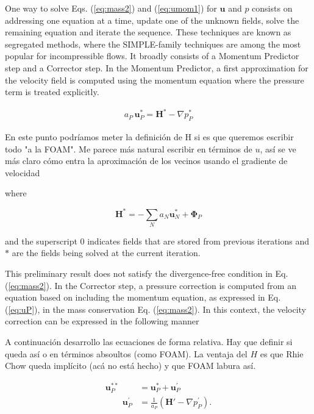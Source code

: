 \documentclass[final,3p,times,10pt,onecolumn]{myElsarticle}
\numberwithin{equation}{section}
\newcommand{\CIP}[1]{{\color{blue} #1}}
\begin{document}
One way to solve Eqs. (\ref{eq:mass2}) and (\ref{eq:umom1}) for $\boldsymbol{u}$ and $p$ consists on addressing one equation at a time, update one of the unknown fields, solve the remaining equation and iterate the sequence. These techniques are known as segregated methods, where the SIMPLE-family techniques \cite{patankar1972,patankar1980,patankar1981,vanDoormal,issa} are among the most popular for incompressible flows. It broadly consists of a Momentum Predictor step and a Corrector step. In the Momentum Predictor, a first approximation for the velocity field is computed using the momentum equation where the pressure term is treated explicitly. 
{\color{red}
\begin{equation} \label{eq:MOMPRED}
\begin{split}
a_P\, \boldsymbol{u}_P^{*} = \boldsymbol{H}^* - \nabla p_P^{*}%
\end{split}
\end{equation}

\CIP{En este punto podríamos meter la definición de H si es que queremos escribir todo "a la FOAM". Me parece más natural escribir en términos de $u$, así se ve más claro cómo entra la aproximación de los vecinos usando el gradiente de velocidad}

\noindent where 

\begin{equation}
\boldsymbol{H}^* = - \sum_N a_N \boldsymbol{u}_N^* + \boldsymbol{\Phi}_P    
\end{equation}

\noindent and the superscript $0$ indicates fields that are stored from previous iterations and $*$ are the fields being solved at the current iteration. }
This preliminary result does not satisfy the divergence-free condition in Eq. (\ref{eq:mass2}). In the Corrector step, a pressure correction is computed from an equation based on including the momentum equation, as expressed in Eq. (\ref{eq:uP}), in the mass conservation  Eq. (\ref{eq:mass2}). In this context, the velocity correction can be expressed in the following manner

\CIP{A continuación desarrollo las ecuaciones de forma relativa. Hay que definir si queda así o en términos absoultos (como FOAM). La ventaja del $H$ es que Rhie Chow queda implícito (acá no está hecho) y que FOAM labura así.}

\begin{align}
\label{eq:uprimeDef}
\boldsymbol{u}_P^{**} &= \boldsymbol{u}_P^{*} + \boldsymbol{u}_P^{'} \\
\qquad \boldsymbol{u}_P^{'} &= \frac{1}{a_P}\left(\boldsymbol{H}'- \nabla p_P^{'}\right).
\end{align}
\end{document}
